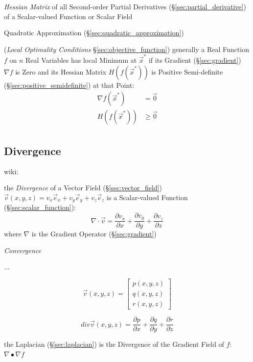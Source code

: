 {\emph{Hessian Matrix} of all Second-order Partial Derivatives
(\S\ref{sec:partial_derivative}) of a Scalar-valued Function or Scalar Field

\fist Quadratic Approximation (\S\ref{sec:quadratic_approximation})

(\emph{Local Optimality Conditions} \S\ref{sec:objective_function}) generally a
Real Function $f$ on $n$ Real Variables has local Minimum at $\vec{x}^*$ if its
Gradient (\S\ref{sec:gradient}) $\nabla f$ is Zero and its Hessian Matrix
$H(f(\vec{x}^*))$ is Positive Semi-definite (\S\ref{sec:positive_semidefinite})
at that Point:
\begin{align*}
  \nabla f(\vec{x}^*) & = \vec{0}    \\
  H(f(\vec{x}^*))     & \geq \vec{0} \\
\end{align*}



\subsection{Divergence}\label{sec:divergence}

wiki:

the \emph{Divergence} of a Vector Field (\S\ref{sec:vector_field})
$\vec{v}(x,y,z) = v_x\vec{e}_x + v_y\vec{e}_y + v_z\vec{e}_z$ is a
Scalar-valued Function (\S\ref{sec:scalar_function}):
\[
  \nabla \cdot \vec{v} =
    \frac{\partial v_x}{\partial x} +
    \frac{\partial v_y}{\partial y} +
    \frac{\partial v_z}{\partial z}
\]
where $\nabla$ is the Gradient Operator (\S\ref{sec:gradient})

\emph{Convergence}

...

\[
  \vec{v}(x,y,z) = \begin{bmatrix}
    p(x,y,z) \\
    q(x,y,z) \\
    r(x,y,z)
  \end{bmatrix}
\]

\[
  div\vec{v}(x,y,z)
    = \frac{\partial{p}}{\partial{x}}
    + \frac{\partial{q}}{\partial{y}}
    + \frac{\partial{r}}{\partial{z}}
\]

the Laplacian (\S\ref{sec:laplacian}) is the Divergence of the Gradient Field
of $f$: $\nabla \bullet \nabla f$

}
